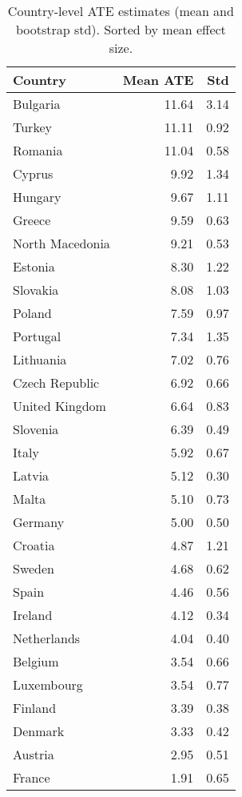\begin{table}[htbp]
  \centering
  \caption{Country-level ATE estimates (mean and bootstrap std). Sorted by mean effect size.}
  \label{tab:ate-country-list}
  \begin{tabular}{lrr}
    \hline
    Country & Mean ATE & Std \\
    \hline
    Bulgaria & 11.64 & 3.14 \\
    Turkey & 11.11 & 0.92 \\
    Romania & 11.04 & 0.58 \\
    Cyprus & 9.92 & 1.34 \\
    Hungary & 9.67 & 1.11 \\
    Greece & 9.59 & 0.63 \\
    North Macedonia & 9.21 & 0.53 \\
    Estonia & 8.30 & 1.22 \\
    Slovakia & 8.08 & 1.03 \\
    Poland & 7.59 & 0.97 \\
    Portugal & 7.34 & 1.35 \\
    Lithuania & 7.02 & 0.76 \\
    Czech Republic & 6.92 & 0.66 \\
    United Kingdom & 6.64 & 0.83 \\
    Slovenia & 6.39 & 0.49 \\
    Italy & 5.92 & 0.67 \\
    Latvia & 5.12 & 0.30 \\
    Malta & 5.10 & 0.73 \\
    Germany & 5.00 & 0.50 \\
    Croatia & 4.87 & 1.21 \\
    Sweden & 4.68 & 0.62 \\
    Spain & 4.46 & 0.56 \\
    Ireland & 4.12 & 0.34 \\
    Netherlands & 4.04 & 0.40 \\
    Belgium & 3.54 & 0.66 \\
    Luxembourg & 3.54 & 0.77 \\
    Finland & 3.39 & 0.38 \\
    Denmark & 3.33 & 0.42 \\
    Austria & 2.95 & 0.51 \\
    France & 1.91 & 0.65 \\
    \hline
  \end{tabular}
\end{table}